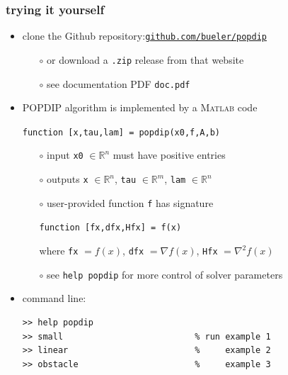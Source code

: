 \documentclass[10pt,hyperref]{beamer}
\newcommand{\grad}{\nabla}
\newcommand{\RR}{\mathbb{R}}
\newcommand{\Matlab}{\textsc{Matlab}\xspace}
\begin{document}
\begin{frame}[fragile]
\frametitle{trying it yourself}

\begin{itemize}
\item clone the Github repository:\hfill \href{https://github.com/bueler/popdip}{\texttt{github.com/bueler/popdip}}
    \begin{itemize}
    \item[$\circ$] or download a \texttt{.zip} release from that website
    \item[$\circ$] see documentation PDF \texttt{doc.pdf}
    \end{itemize}
\item POPDIP algorithm is implemented by a \Matlab code

\medskip
\centerline{\texttt{function [x,tau,lam] = popdip(x0,f,A,b)}}

\medskip
    \begin{itemize}
    \item[$\circ$] input \texttt{x0} $\in\RR^n$ must have positive entries
    \item[$\circ$] outputs \texttt{x} $\in\RR^n$, \texttt{tau} $\in\RR^m$, \texttt{lam} $\in\RR^n$
    \item[$\circ$] user-provided function \texttt{f} has signature

\medskip
\centerline{\texttt{function [fx,dfx,Hfx] = f(x)}}

\medskip
    where \texttt{fx} $=f(x)$, \texttt{dfx} $=\grad f(x)$, \texttt{Hfx} $= \grad^2 f(x)$
    \item[$\circ$] see \texttt{help popdip} for more control of solver parameters
    \end{itemize}

\item command line:
\begin{Verbatim}[fontsize=\small]
>> help popdip
>> small                          % run example 1
>> linear                         %     example 2
>> obstacle                       %     example 3
\end{Verbatim}
\end{itemize}
\end{frame}
\end{document}
